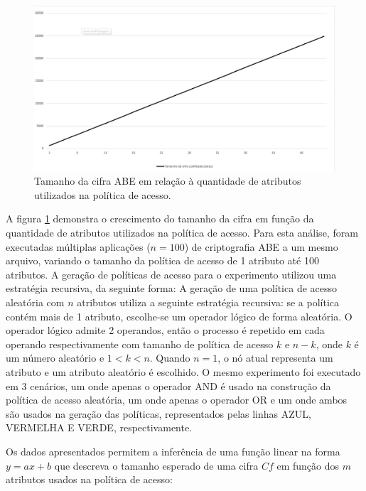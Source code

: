 \documentclass[a4paper,11pt]{article}
\begin{document}
\begin{figure}[!h]
  \centering
  \includegraphics[width=\textwidth]{images/resultados-tamanho-cifra-crescimento.png}
  \caption{Tamanho da cifra ABE em relação à quantidade de atributos utilizados na política de acesso.}
  \label{fig:crescimento-cifra}
\end{figure}

A figura \ref{fig:crescimento-cifra} demonstra o crescimento do tamanho da cifra em função da quantidade de atributos utilizados na política de acesso. Para esta análise, foram executadas múltiplas aplicações ($n=100$) de criptografia ABE a um mesmo arquivo, variando o tamanho da política de acesso de 1 atributo até 100 atributos.
A geração de políticas de acesso para o experimento utilizou uma estratégia recursiva, da seguinte forma:
A geração de uma política de acesso aleatória com $n$ atributos utiliza a seguinte estratégia recursiva:
se a política contém mais de 1 atributo, escolhe-se um operador lógico de forma aleatória.
O operador lógico admite 2 operandos, então o processo é repetido em cada operando respectivamente com tamanho de política de acesso $k$ e $n-k$, onde $k$ é um número aleatório e $1 < k < n$.
Quando $n = 1$, o nó atual representa um atributo e um atributo aleatório é escolhido.
O mesmo experimento foi executado em 3 cenários, um onde apenas o operador AND é usado na construção da política de acesso aleatória, um onde apenas o operador OR e um onde ambos são usados na geração das políticas, representados pelas linhas AZUL, VERMELHA E VERDE, respectivamente.

Os dados apresentados permitem a inferência de uma função linear na forma $y = ax + b$ que descreva o tamanho esperado de uma cifra $Cf$ em função dos $m$ atributos usados na política de acesso:
\end{document}
